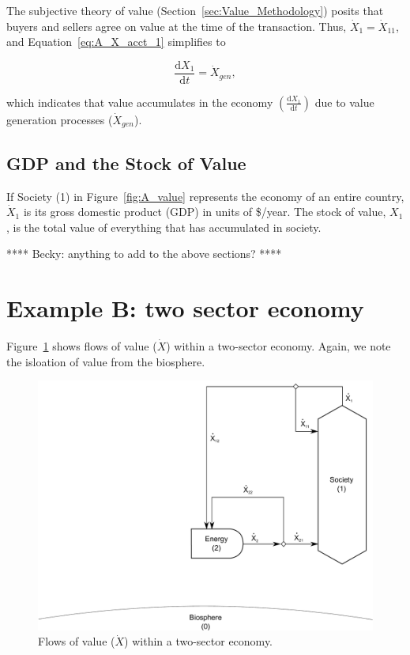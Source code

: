 The subjective theory of value
(Section~\ref{sec:Value_Methodology})
posits that buyers and sellers agree on value at the 
time of the transaction.
Thus, $\dot{X}_{1} = \dot{X}_{11}$, and Equation~\ref{eq:A_X_acct_1}
simplifies to

\begin{equation} \label{eq:A_X_acct_2}	
	\frac{\mathrm{d}X_{1}}{\mathrm{d}t}	
	= \dot{X}_{gen},
\end{equation}

\noindent which indicates that value accumulates in the economy
$\left( \frac{\mathrm{d}X_{1}}{\mathrm{d}t} \right)$
due to value generation processes ($\dot{X}_{gen}$).


\subsection{GDP and the Stock of Value}

If Society (1) in Figure~\ref{fig:A_value} represents 
the economy of an entire country, 
$\dot{X}_{1}$ is its gross domestic product (GDP)
in units of \$/year.
The stock of value, $X_1$, is the total value of everything that 
has accumulated in society.

**** Becky: anything to add to the above sections? ****


\section{Example B: two sector economy}

Figure~\ref{fig:B_value} shows flows of value ($\dot{X}$) 
within a two-sector economy. 
Again, we note the isloation of value from the biosphere.

\begin{figure}[h!]
\centering
\includegraphics[width=0.8\linewidth]{Part_3/Chapter_Values/images/2_sector_value.pdf}
\caption{Flows of value ($\dot{X}$) within a two-sector economy.}
\label{fig:B_value}
\end{figure}

